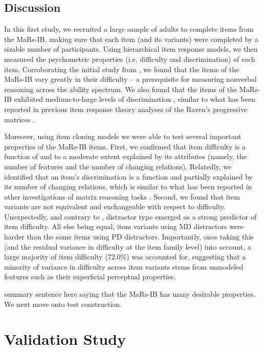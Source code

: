 \documentclass[a4paper,man,natbib]{apa6}
\begin{document}
\subsection{Discussion}

In this first study, we recruited a large sample of adults to complete items from the MaRs-IB, making sure that each item (and its variants) were completed by a sizable number of participants. Using hierarchical item response models, we then measured the psychometric properties (i.e. difficulty and discrimination) of each item. Corroborating the initial study from \cite{chierchia2019matrix}, we found that the items of the MaRs-IB vary greatly in their difficulty -- a prerequisite for measuring nonverbal reasoning across the ability spectrum. We also found that the items of the MaRs-IB exhibited medium-to-large levels of discrimination \citep{baker2017basics}, similar to what has been reported in previous item response theory analyses of the Raven's progressive matrices \citep{chiesi2012using}.

Moreover, using item cloning models we were able to test several important properties of the MaRs-IB items. First, we confirmed that item difficulty is a function of and to a moderate extent explained by its attributes (namely, the number of features and the number of changing relations). Relatedly, we identified that an item's discrimination is a function and partially explained by its number of changing relations, which is similar to what has been reported in other investigations of matrix reasoning tasks \citep{embretson1999generating}. Second, we found that item variants are not equivalent and exchangeable with respect to difficulty. Unexpectedly, and contrary to \cite{chierchia2019matrix}, distractor type emerged as a strong predictor of item difficulty. All else being equal, item variants using MD distractors were harder than the same items using PD distractors. Importantly, once taking this (and the residual variance in difficulty at the item family level) into account, a large majority of item difficulty (72.0\%) was accounted for, suggesting that a minority of variance in difficulty across item variants stems from unmodeled features such as their superficial perceptual properties. 

summary sentence here saying that the MaRs-IB has many desirable properties. We next move onto test construction.

\section{Validation Study}
\end{document}
